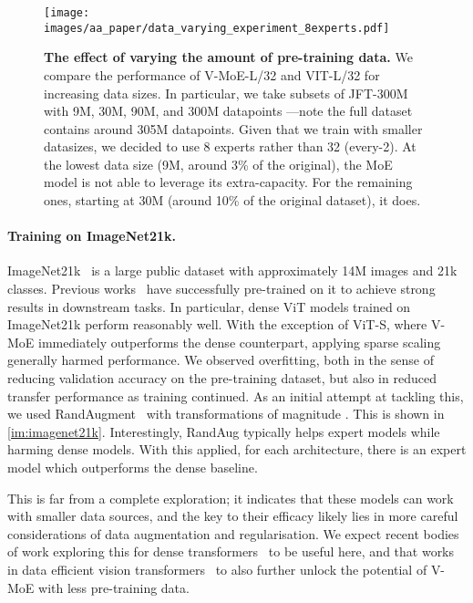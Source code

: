 \documentclass{article}
\newcommand{\abbv}{{V-MoE}}
\begin{document}
\begin{figure}[h]
\centering
\texttt{[image: images/aa\_paper/data\_varying\_experiment\_8experts.pdf]}
\caption{\textbf{The effect of varying the amount of pre-training data.}
We compare the performance of \abbv{}-L/32 and VIT-L/32 for increasing data sizes.
In particular, we take subsets of JFT-300M with 9M, 30M, 90M, and 300M datapoints ---note the full dataset contains around 305M datapoints.
Given that we train with smaller datasizes, we decided to use 8 experts rather than 32 (every-2).
At the lowest data size (9M, around 3\% of the original), the MoE model is not able to leverage its extra-capacity.
For the remaining ones, starting at 30M (around 10\% of the original dataset), it does.
}
\label{im:data_efficiency}
\end{figure}


\paragraph{Training on ImageNet21k.}
ImageNet21k~\cite{deng2009imagenet} is a large public dataset with approximately 14M images and 21k classes. Previous works~\cite{dosovitskiy2020image,kolesnikov2019big} have successfully pre-trained on it to achieve strong results in downstream tasks. In particular, dense ViT models trained on ImageNet21k perform reasonably well.
With the exception of ViT-S, where \abbv{} immediately outperforms the dense counterpart, applying sparse scaling generally harmed performance. We observed overfitting, both in the sense of reducing validation accuracy on the pre-training dataset, but also in reduced transfer performance as training continued. As an initial attempt at tackling this, we used RandAugment~\cite{randaug2020cubuk} with  transformations of magnitude . This is shown in \cref{im:imagenet21k}. Interestingly, RandAug typically helps expert models while harming dense models. With this applied, for each architecture, there is an expert model which outperforms the dense baseline.

This is far from a complete exploration; it indicates that these models can work with smaller data sources, and the key to their efficacy likely lies in more careful considerations of data augmentation and regularisation. We expect recent bodies of work exploring this for dense transformers~\cite{jiang2021token,touvron2021cait} to be useful here, and that works in data efficient vision transformers~\cite{touvron2020deit,yuan2021tokens} to also further unlock the potential of \abbv{} with less pre-training data.
\end{document}
